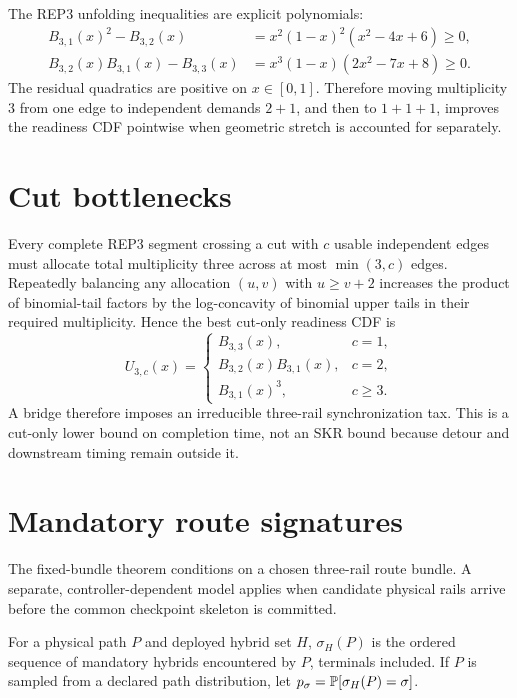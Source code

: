\documentclass[aps,prx,preprint,superscriptaddress,nofootinbib,longbibliography]{revtex4-2}
\begin{document}
The REP3 unfolding inequalities are explicit polynomials:
\begin{align}
B_{3,1}(x)^2-B_{3,2}(x)&=x^2(1-x)^2(x^2-4x+6)\ge0,\\
B_{3,2}(x)B_{3,1}(x)-B_{3,3}(x)&=x^3(1-x)(2x^2-7x+8)\ge0.
\end{align}
The residual quadratics are positive on $x\in[0,1]$. Therefore moving multiplicity $3$ from one edge to independent demands $2+1$, and then to $1+1+1$, improves the readiness CDF pointwise when geometric stretch is accounted for separately.

\section{Cut bottlenecks}
Every complete REP3 segment crossing a cut with $c$ usable independent edges must allocate total multiplicity three across at most $\min(3,c)$ edges. Repeatedly balancing any allocation $(u,v)$ with $u\ge v+2$ increases the product of binomial-tail factors by the log-concavity of binomial upper tails in their required multiplicity. Hence the best cut-only readiness CDF is
\begin{equation}
U_{3,c}(x)=
\begin{cases}
B_{3,3}(x),&c=1,\\
B_{3,2}(x)B_{3,1}(x),&c=2,\\
B_{3,1}(x)^3,&c\ge3.
\end{cases}
\end{equation}
A bridge therefore imposes an irreducible three-rail synchronization tax. This is a cut-only lower bound on completion time, not an SKR bound because detour and downstream timing remain outside it.

\section{Mandatory route signatures}
The fixed-bundle theorem conditions on a chosen three-rail route bundle. A separate, controller-dependent model applies when candidate physical rails arrive before the common checkpoint skeleton is committed.

\begin{definition}
For a physical path $P$ and deployed hybrid set $H$, $\sigma_H(P)$ is the ordered sequence of mandatory hybrids encountered by $P$, terminals included. If $P$ is sampled from a declared path distribution, let $p_\sigma=\mathbb P[\sigma_H(P)=\sigma]$.
\end{definition}
\end{document}
